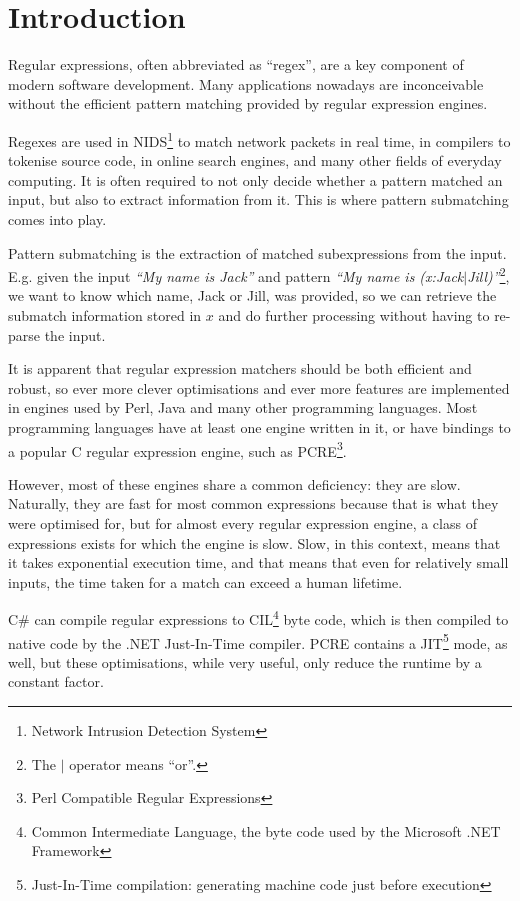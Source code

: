 \chapter{Introduction}
\setcounter{page}{1}

Regular expressions, often abbreviated as ``regex'', are a key component of
modern software development. Many applications nowadays are inconceivable
without the efficient pattern matching provided by regular expression engines.

Regexes are used in NIDS\footnote{Network Intrusion Detection System} to match
network packets in real time, in compilers to tokenise source code, in online
search engines, and many other fields of everyday computing. It is often
required to not only decide whether a pattern matched an input, but also to
extract information from it. This is where pattern submatching comes into play.

Pattern submatching is the extraction of matched subexpressions from the input.
E.g. given the input \textit{``My name is Jack''} and pattern \textit{``My name
is (x:Jack$|$Jill)''}\footnote{The $|$ operator means ``or''.}, we want to know
which name, Jack or Jill, was provided, so we can retrieve the submatch
information stored in $x$ and do further processing without having to re-parse
the input.

It is apparent that regular expression matchers should be both efficient and
robust, so ever more clever optimisations and ever more features are implemented
in engines used by Perl, Java and many other programming languages. Most
programming languages have at least one engine written in it, or have bindings
to a popular C regular expression engine, such as PCRE\footnote{Perl Compatible
Regular Expressions}.

However, most of these engines share a common deficiency: they are slow.
Naturally, they are fast for most common expressions because that is what they
were optimised for, but for almost every regular expression engine, a class of
expressions exists for which the engine is slow. Slow, in this context, means
that it takes exponential execution time, and that means that even for
relatively small inputs, the time taken for a match can exceed a human lifetime.

C\# can compile regular expressions to CIL\footnote{Common Intermediate
Language, the byte code used by the Microsoft .NET Framework} byte code, which
is then compiled to native code by the .NET Just-In-Time compiler. PCRE contains
a JIT\footnote{Just-In-Time compilation: generating machine code just before
execution} mode, as well, but these optimisations, while very useful, only
reduce the runtime by a constant factor.

